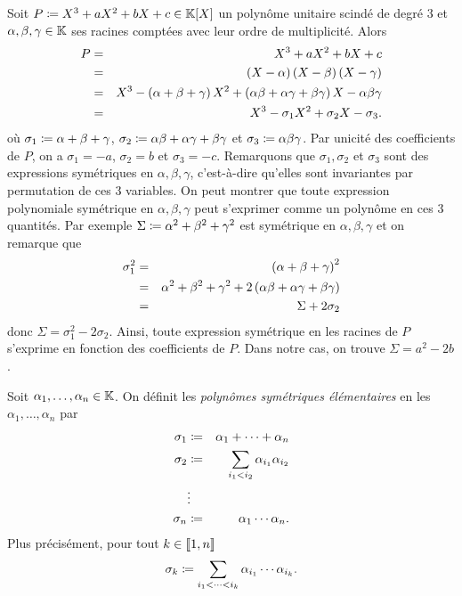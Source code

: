 \documentclass{magnolia}
\begin{document}
Soit $P\defeq X^3+aX^2+bX+c\in\polyK$ un polynôme unitaire scindé de degré 3 et $\alpha,\beta,\gamma\in\mathbb{K}$ ses racines comptées avec leur ordre de multiplicité. Alors
  \begin{eqnarray*}
  P&=&X^3+aX^2+bX+c\\
  &=&\left(X-\alpha\right)\left(X-\beta\right)\left(X-\gamma\right)\\
  &=& X^3-\left(\alpha+\beta+\gamma\right)X^2+\left(\alpha\beta+\alpha\gamma+\beta\gamma\right)X
      -\alpha\beta\gamma\\
  &=& X^3-\sigma_1 X^2+\sigma_2 X-\sigma_3.
  \end{eqnarray*}
  où $\sigma_1\coloneqq\alpha+\beta+\gamma$,
  $\sigma_2\coloneqq\alpha\beta+\alpha\gamma+\beta\gamma$ et $\sigma_3\coloneqq\alpha\beta\gamma$.
  Par unicité des coefficients de $P$, on a $\sigma_1=-a$, $\sigma_2=b$ et $\sigma_3=-c$.
  Remarquons que $\sigma_1,\sigma_2$ et $\sigma_3$ sont des expressions symétriques en $\alpha,\beta,\gamma$,
  c'est-à-dire qu'elles sont invariantes par permutation de ces 3 variables.
  On peut montrer que toute expression polynomiale symétrique en
  $\alpha,\beta,\gamma$ peut s'exprimer comme un polynôme en ces 3 quantités.
  Par exemple $\Sigma\coloneqq\alpha^2+\beta^2+\gamma^2$ est symétrique en $\alpha,\beta,\gamma$
  et on remarque que
  \begin{eqnarray*}
  \sigma_1^2
  &=& \left(\alpha+\beta+\gamma\right)^2\\
  &=& \alpha^2+\beta^2+\gamma^2+2\left(\alpha\beta+\alpha\gamma+\beta\gamma\right)\\
  &=& \Sigma+2\sigma_2
  \end{eqnarray*}
  donc $\Sigma=\sigma_1^2-2\sigma_2$. Ainsi, toute expression symétrique en les racines de
  $P$ s'exprime en fonction des coefficients de $P$. Dans notre cas, on trouve
  $\Sigma=a^2-2b$.

\begin{definition}
Soit $\alpha_1,\ldots,\alpha_n\in\mathbb{K}$. On définit les \emph{polynômes symétriques
élémentaires} en les $\alpha_1,\ldots,\alpha_n$ par
\begin{eqnarray*}
  \sigma_1 &\coloneqq& \alpha_1+\cdots+\alpha_n\\
  \sigma_2 &\coloneqq& \sum_{i_1<i_2} \alpha_{i_1}\alpha_{i_2}\\
           &\vdots& \\
  \sigma_n &\coloneqq& \alpha_1\cdots \alpha_n.
\end{eqnarray*}
Plus précisément, pour tout $k\in\left\llbracket 1,n\right\rrbracket$
\[\sigma_k \coloneqq \sum_{i_1<\cdots<i_k} \alpha_{i_1}\cdots \alpha_{i_k}.\]
\end{definition}
\end{document}
